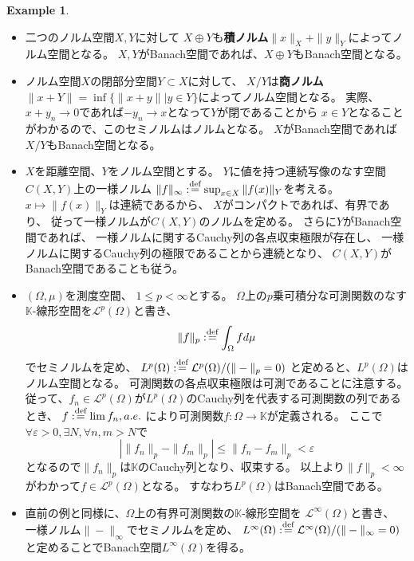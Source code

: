 \documentclass[uplatex]{jsarticle}
\theoremstyle{definition}
\newtheorem{exam}[exam]{Example}
\newcommand{\ep}{\varepsilon}
\newcommand{\dfn}{:\overset{\mbox{{\scriptsize def}}}{=}}
\newcommand{\K}{\mathbb{K}}
\newcommand{\mcL}{\mathcal{L}}
\begin{document}
\begin{exam}
  \begin{itemize}
    \item 二つのノルム空間\(X,Y\)に対して
    \(X\oplus Y\)も\textbf{積ノルム}\(\|x\|_X+\|y\|_Y\)によってノルム空間となる。
    \(X,Y\)がBanach空間であれば、\(X\oplus Y\)もBanach空間となる。
    \item ノルム空間\(X\)の閉部分空間\(Y\subset X\)に対して、
    \(X/Y\)は\textbf{商ノルム}\(\|x+Y\| = \inf\{\|x+y\| | y\in Y\}\)によってノルム空間となる。
    実際、\(x+y_n\to 0\)であれば\(-y_n\to x\)となって\(Y\)が閉であることから
    \(x\in Y\)となることがわかるので、このセミノルムはノルムとなる。
    \(X\)がBanach空間であれば\(X/Y\)もBanach空間となる。
    \item
    \(X\)を距離空間、\(Y\)をノルム空間とする。
    \(Y\)に値を持つ連続写像のなす空間\(C(X,Y)\)上の一様ノルム
    \(\|f\|_{\infty} \dfn \sup_{x\in X}\|f(x)\|_Y\)を考える。
    \(x\mapsto \|f(x)\|_Y\)は連続であるから、
    \(X\)がコンパクトであれば、有界であり、
    従って一様ノルムが\(C(X,Y)\)のノルムを定める。
    さらに\(Y\)がBanach空間であれば、
    一様ノルムに関するCauchy列の各点収束極限が存在し、
    一様ノルムに関するCauchy列の極限であることから連続となり、
    \(C(X,Y)\)がBanach空間であることも従う。
    \item
    \((\Omega,\mu)\)を測度空間、
    \(1\leq p < \infty\)とする。
    \(\Omega\)上の\(p\)乗可積分な可測関数のなす\(\K\)-線形空間を\(\mcL^p(\Omega)\)と書き、
    \[\|f\|_p\dfn \int_{\Omega}fd\mu\]
    でセミノルムを定め、
    \(L^p(\Omega) \dfn \mcL^p(\Omega)/(\|-\|_p=0)\)
    と定めると、\(L^p(\Omega)\)はノルム空間となる。
    可測関数の各点収束極限は可測であることに注意する。
    従って、\(f_n\in \mcL^p(\Omega)\)が\(L^p(\Omega)\)のCauchy列を代表する可測関数の列であるとき、
    \(f \dfn \lim f_n , a.e.\)
    により可測関数\(f:\Omega \to \K\)が定義される。
    ここで\(\forall \ep>0, \exists N, \forall n,m > N\)で
    \[ | \|f_n\|_p - \|f_m\|_p| \leq \|f_n-f_m\|_p < \ep\]
    となるので\(\|f_n\|_p\)は\(\K\)のCauchy列となり、収束する。
    以上より\(\|f\|_p < \infty\)がわかって\(f\in \mcL^p(\Omega)\)となる。
    すなわち\(L^p(\Omega)\)はBanach空間である。
    \item
    直前の例と同様に、\(\Omega\)上の有界可測関数の\(\K\)-線形空間を
    \(\mcL^{\infty}(\Omega)\)と書き、
    一様ノルム\(\|-\|_{\infty}\)でセミノルムを定め、
    \(L^{\infty}(\Omega) \dfn \mcL^{\infty}(\Omega)/(\|-\|_{\infty}=0)\)
    と定めることでBanach空間\(L^{\infty}(\Omega)\)を得る。
  \end{itemize}
\end{exam}
\end{document}

